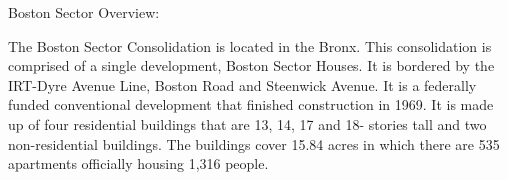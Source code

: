 Boston Sector Overview:     

   

The Boston Sector Consolidation is located in the Bronx. This consolidation is comprised of a single development, Boston Sector Houses. It is bordered by the IRT-Dyre Avenue Line, Boston Road and Steenwick Avenue. It is a federally funded conventional development that finished construction in 1969. It is made up of four residential buildings that are 13, 14, 17 and 18- stories tall and two non-residential buildings. The buildings cover 15.84 acres in which there are 535 apartments officially housing 1,316 people.